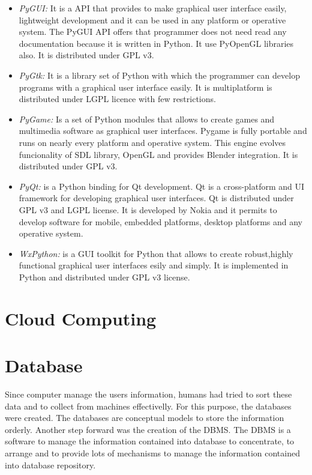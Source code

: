 \begin{itemize}
\item \emph {PyGUI:} It is a API that provides to make graphical user interface
  easily, lightweight development and it can be used in any platform or
  operative system. The PyGUI API offers that programmer does
  not need read any documentation because it is written in Python. It use
  PyOpenGL libraries also. It is distributed under GPL v3.
\item \emph{PyGtk:} It is a library set of Python with which the programmer can
  develop  programs with a graphical user interface easily. It is multiplatform
  is distributed under LGPL licence with few restrictions.
\item \emph{PyGame:} Is a set of Python modules that allows to create games and
  multimedia software as graphical user interfaces. Pygame is fully portable and
  runs on nearly every platform and operative system. This engine evolves
  funcionality of SDL library, OpenGL and provides Blender integration. It is
  distributed under GPL v3.
\item \emph{PyQt:} is a Python binding for Qt development. Qt is a
  cross-platform  and UI framework for  developing graphical user interfaces. Qt
  is distributed under GPL v3 and LGPL license. It is developed by Nokia and it
  permits to develop software for mobile, embedded platforms, desktop platforms
  and any operative system.
\item \emph{WxPython:} is a GUI toolkit for Python that allows to create
  robust,highly functional graphical user interfaces esily and simply. It is
  implemented in Python and distributed under GPL v3 license.
\end{itemize}


\section{Cloud Computing}




\section{Database}
Since computer manage the users information, humans had tried to sort these data
and to collect from machines effectivelly. For this purpose, the databases were
created. The databases are conceptual models to store the information
orderly. Another step forward was the creation of the \ac{DBMS}. The \ac{DBMS}
is a software to manage the information contained into database to concentrate,
to arrange and to provide lots of mechanisms to manage the information contained
into database repository.

